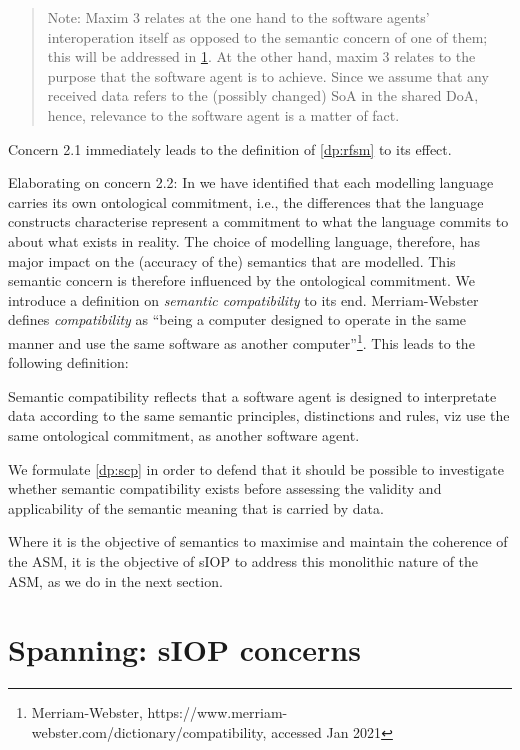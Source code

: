 \documentclass[sort&compress,preprint,authoryear,3p,twocolumn]{elsarticle}
\begin{document}
\begin{quote}
Note: Maxim 3 relates at the one hand to the software agents'
interoperation itself as opposed to the semantic concern of one of them;
this will be addressed in \cref{spanning-siop-concerns}. At the other
hand, maxim 3 relates to the purpose that the software agent is to
achieve. Since we assume that any received data refers to the (possibly
changed) SoA in the shared DoA, hence, relevance to the software agent
is a matter of fact.
\end{quote}

Concern 2.1 immediately leads to the definition of \cref{dp:rfsm} to its
effect.

Elaborating on concern 2.2: In \citep{Brandt2021a} we have identified
that each modelling language carries its own ontological commitment,
i.e., the differences that the language constructs characterise
represent a commitment to what the language commits to about what exists
in reality. The choice of modelling language, therefore, has major
impact on the (accuracy of the) semantics that are modelled. This
semantic concern is therefore influenced by the ontological commitment.
We introduce a definition on \emph{semantic compatibility} to its end.
Merriam-Webster defines \emph{compatibility} as ``being a computer
designed to operate in the same manner and use the same software as
another computer''\footnote{Merriam-Webster,
  https://www.merriam-webster.com/dictionary/compatibility, accessed Jan
  2021}. This leads to the following definition:

\begin{mmdef}\label{def:semantic-compatibility}
Semantic compatibility reflects that a software agent is designed to interpretate data according to the same semantic principles, distinctions and rules, viz use the same ontological commitment, as another software agent. 
\end{mmdef}

We formulate \cref{dp:scp} in order to defend that it should be possible
to investigate whether semantic compatibility exists before assessing
the validity and applicability of the semantic meaning that is carried
by data.

Where it is the objective of semantics to maximise and maintain the
coherence of the ASM, it is the objective of sIOP to address this
monolithic nature of the ASM, as we do in the next section.

\hypertarget{spanning-siop-concerns}{%
\section{Spanning: sIOP concerns}\label{spanning-siop-concerns}}
\end{document}
